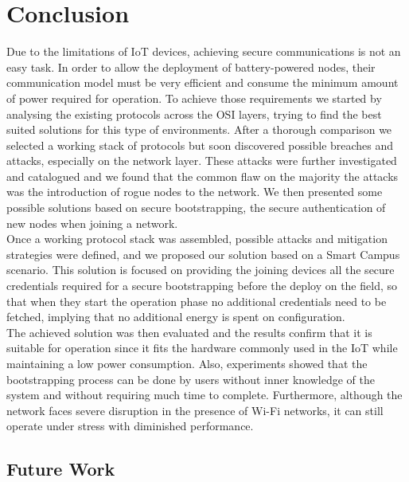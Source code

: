 
\chapter{Conclusion}
\label{chapter:conclusion}
Due to the limitations of \gls{IoT} devices, achieving secure communications is not an easy task. In order to allow the deployment of battery-powered nodes, their communication model must be very efficient and consume the minimum amount of power required for operation. To achieve those requirements we started by analysing the existing protocols across the OSI layers, trying to find the best suited solutions for this type of environments. After a thorough comparison we selected a working stack of protocols but soon discovered possible breaches and attacks, especially on the network layer. These attacks were further investigated and catalogued and we found that the common flaw on the majority the attacks was the introduction of rogue nodes to the network. We then presented some possible solutions based on secure bootstrapping, the secure authentication of new nodes when joining a network.\\
Once a working protocol stack was assembled, possible attacks and mitigation strategies were defined, and we proposed our solution based on a Smart Campus scenario. This solution is focused on providing the joining devices all the secure credentials required for a secure bootstrapping before the deploy on the field, so that when they start the operation phase no additional credentials need to be fetched, implying that no additional energy is spent on configuration.\\
The achieved solution was then evaluated and the results confirm that it is suitable for operation since it fits the hardware commonly used in the \gls{IoT} while maintaining a low power consumption. Also, experiments showed that the bootstrapping process can be done by users without inner knowledge of the system and without requiring much time to complete. Furthermore, although the network faces severe disruption in the presence of Wi-Fi networks, it can still operate under stress with diminished performance.

\section{Future Work}

